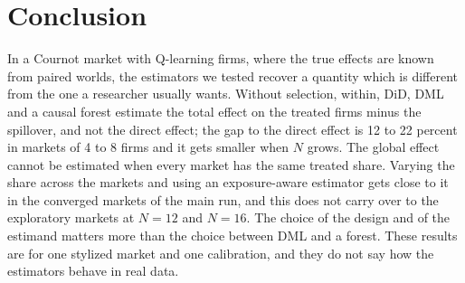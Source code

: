 \documentclass[11pt]{article}
\begin{document}
\section{Conclusion}
In a Cournot market with Q-learning firms, where the true effects are known from paired worlds, the estimators we tested recover a quantity which is different from the one a researcher usually wants. Without selection, within, DiD, DML and a causal forest estimate the total effect on the treated firms minus the spillover, and not the direct effect; the gap to the direct effect is 12 to 22 percent in markets of 4 to 8 firms and it gets smaller when $N$ grows. The global effect cannot be estimated when every market has the same treated share. Varying the share across the markets and using an exposure-aware estimator gets close to it in the converged markets of the main run, and this does not carry over to the exploratory markets at $N=12$ and $N=16$. The choice of the design and of the estimand matters more than the choice between DML and a forest. These results are for one stylized market and one calibration, and they do not say how the estimators behave in real data.




\appendix
\end{document}
